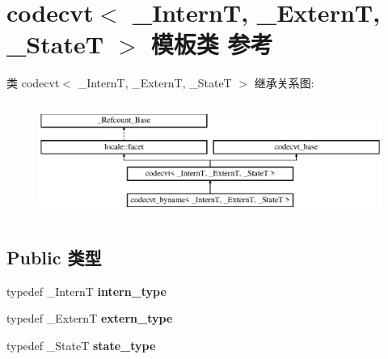 \hypertarget{classcodecvt}{}\section{codecvt$<$ \+\_\+\+InternT, \+\_\+\+ExternT, \+\_\+\+StateT $>$ 模板类 参考}
\label{classcodecvt}
类 codecvt$<$ \+\_\+\+InternT, \+\_\+\+ExternT, \+\_\+\+StateT $>$ 继承关系图\+:\begin{figure}[H]
\begin{center}
\leavevmode
\includegraphics[height=3.783784cm]{classcodecvt}
\end{center}
\end{figure}
\subsection*{Public 类型}
\begin{DoxyCompactItemize}
\item 
\mbox{\label{classcodecvt_a912930d10a22c61948478d09c3cec534}} 
typedef \+\_\+\+InternT {\bfseries intern\+\_\+type}
\item 
\mbox{\label{classcodecvt_a5760ad54fa46cc105801b56c5f952d1d}} 
typedef \+\_\+\+ExternT {\bfseries extern\+\_\+type}
\item 
\mbox{\label{classcodecvt_ab661438726223264ced7258736ca4a40}} 
typedef \+\_\+\+StateT {\bfseries state\+\_\+type}
\end{DoxyCompactItemize}
